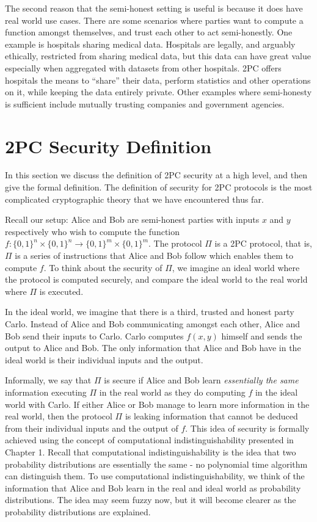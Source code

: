 The second reason that the semi-honest setting is useful is because it does have real world use cases.
There are some scenarios where parties want to compute a function amongst themselves, and trust each other to act semi-honestly.
One example is hospitals sharing medical data.
Hospitals are legally, and arguably ethically, restricted from sharing medical data, but this data can have great value especially when aggregated with datasets from other hospitals.
2PC offers hospitals the means to ``share'' their data, perform statistics and other operations on it, while keeping the data entirely private. 
Other examples where semi-honesty is sufficient include mutually trusting companies and government agencies.

\section{2PC Security Definition}
In this section we discuss the definition of 2PC security at a high level, and then give the formal definition. 
The definition of security for 2PC protocols is the most complicated cryptographic theory that we have encountered thus far. 

Recall our setup: Alice and Bob are semi-honest parties with inputs $x$ and $y$ respectively who wish to compute the function $f: \{0,1\}^n \times \{0,1\}^n \to \{0,1\}^m \times \{0,1\}^m$.
The protocol $\Pi$ is a 2PC protocol, that is, $\Pi$ is a series of instructions that Alice and Bob follow which enables them to compute $f$.
To think about the security of $\Pi$, we imagine an ideal world where the protocol is computed securely, and compare the ideal world to the real world where $\Pi$ is executed.

In the ideal world, we imagine that there is a third, trusted and honest party Carlo.
Instead of Alice and Bob communicating amongst each other, Alice and Bob send their inputs to Carlo.
Carlo computes $f(x,y)$ himself and sends the output to Alice and Bob.
The only information that Alice and Bob have in the ideal world is their individual inputs and the output.

Informally, we say that $\Pi$ is secure if Alice and Bob learn \textit{essentially the same} information executing $\Pi$ in the real world as they do computing $f$ in the ideal world with Carlo.
If either Alice or Bob manage to learn more information in the real world, then the protocol $\Pi$ is leaking information that cannot be deduced from their individual inputs and the output of $f$.
This idea of security is formally achieved using the concept of computational indistinguishability presented in Chapter 1. 
Recall that computational indistinguishability is the idea that two probability distributions are essentially the same - no polynomial time algorithm can distinguish them.
To use computational indistinguishability, we think of the information that Alice and Bob learn in the real and ideal world as probability distributions.
The idea may seem fuzzy now, but it will become clearer as the probability distributions are explained.

